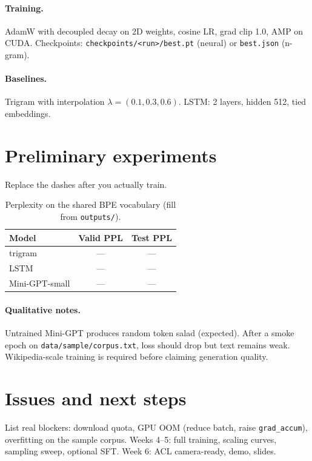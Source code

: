 \documentclass[11pt]{article}
\begin{document}
\paragraph{Training.} AdamW with decoupled decay on 2D weights, cosine LR, grad clip 1.0, AMP on CUDA. Checkpoints: \texttt{checkpoints/<run>/best.pt} (neural) or \texttt{best.json} (n-gram).

\paragraph{Baselines.} Trigram with interpolation $\lambda=(0.1,0.3,0.6)$. LSTM: 2 layers, hidden 512, tied embeddings.

\section{Preliminary experiments}

Replace the dashes after you actually train.

\begin{table}[t]
\centering
\small
\begin{tabular}{lcc}
\toprule
Model & Valid PPL & Test PPL \\
\midrule
trigram     & --- & --- \\
LSTM        & --- & --- \\
Mini-GPT-small & --- & --- \\
\bottomrule
\end{tabular}
\caption{Perplexity on the shared BPE vocabulary (fill from \texttt{outputs/}).}
\end{table}

\paragraph{Qualitative notes.} Untrained Mini-GPT produces random token salad (expected). After a smoke epoch on \texttt{data/sample/corpus.txt}, loss should drop but text remains weak. Wikipedia-scale training is required before claiming generation quality.

\section{Issues and next steps}

List real blockers: download quota, GPU OOM (reduce batch, raise \texttt{grad\_accum}), overfitting on the sample corpus. Weeks 4--5: full training, scaling curves, sampling sweep, optional SFT. Week 6: ACL camera-ready, demo, slides.


\end{document}
